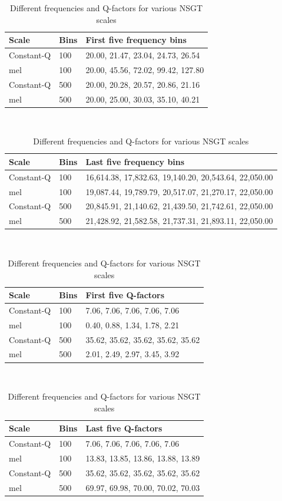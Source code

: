 \documentclass[report.tex]{subfiles}
\begin{document}
\begin{table}[ht]
	\centering
	\caption{Different frequencies and Q-factors for various NSGT scales}
	\label{table:nsgtfreqsandqs}
\begin{tabular}{ |l|l|p{10cm}| }
	 \hline
	 Scale & Bins & First five frequency bins \\
	 \hline
	 \hline
	 Constant-Q & 100 & 20.00, 21.47, 23.04, 24.73, 26.54 \\
	 \hline
	 mel & 100 & 20.00, 45.56, 72.02, 99.42, 127.80 \\
	 \hline
	 Constant-Q & 500 & 20.00, 20.28, 20.57, 20.86, 21.16 \\
	 \hline
	 mel & 500 & 20.00, 25.00, 30.03, 35.10, 40.21 \\
	 \hline
\end{tabular}\\
\vspace{1em}
\begin{tabular}{ |l|l|p{10cm}| }
	 \hline
	 Scale & Bins & Last five frequency bins \\
	 \hline
	 \hline
	 Constant-Q & 100 & 16,614.38, 17,832.63, 19,140.20, 20,543.64, 22,050.00 \\
	 \hline
	 mel & 100 & 19,087.44, 19,789.79, 20,517.07, 21,270.17, 22,050.00 \\
	 \hline
	 Constant-Q & 500 & 20,845.91, 21,140.62, 21,439.50, 21,742.61, 22,050.00 \\
	 \hline
	 mel & 500 & 21,428.92, 21,582.58, 21,737.31, 21,893.11, 22,050.00 \\
	 \hline
\end{tabular}\\
\vspace{1em}
\begin{tabular}{ |l|l|p{10cm}| }
	 \hline
	 Scale & Bins & First five Q-factors \\
	 \hline
	 \hline
	 Constant-Q & 100 & 7.06, 7.06, 7.06, 7.06, 7.06 \\
	 \hline
	 mel & 100 & 0.40, 0.88, 1.34, 1.78, 2.21 \\
	 \hline
	 Constant-Q & 500 & 35.62, 35.62, 35.62, 35.62, 35.62 \\
	 \hline
	 mel & 500 & 2.01, 2.49, 2.97, 3.45, 3.92 \\
	 \hline
\end{tabular}\\
\vspace{1em}
\begin{tabular}{ |l|l|p{10cm}| }
	 \hline
	 Scale & Bins & Last five Q-factors \\
	 \hline
	 \hline
	 Constant-Q & 100 & 7.06, 7.06, 7.06, 7.06, 7.06 \\
	 \hline
	 mel & 100 & 13.83, 13.85, 13.86, 13.88, 13.89 \\
	 \hline
	 Constant-Q & 500 & 35.62, 35.62, 35.62, 35.62, 35.62 \\
	 \hline
	 mel & 500 & 69.97, 69.98, 70.00, 70.02, 70.03 \\
	 \hline
\end{tabular}
\end{table}
\end{document}
